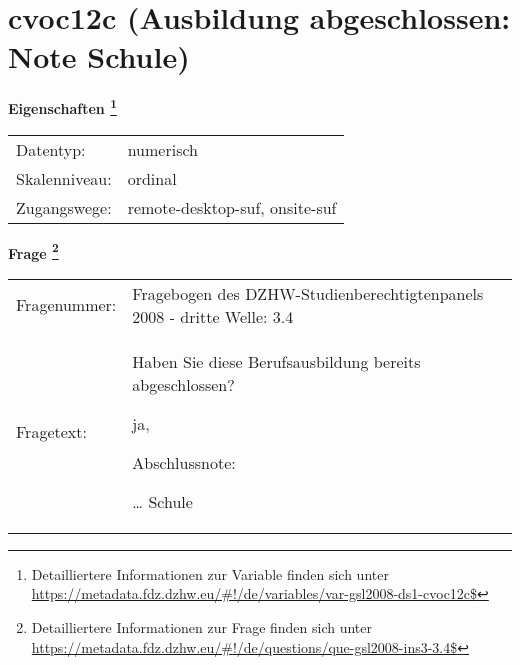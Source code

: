 
    \setcounter{footnote}{0}

    \vspace*{-1.8cm}
	\section{cvoc12c (Ausbildung abgeschlossen: Note Schule)}
	\label{section:cvoc12c}



    \vspace*{0.5cm}
    \noindent\textbf{Eigenschaften
	\footnote{Detailliertere Informationen zur Variable finden sich unter
		\url{https://metadata.fdz.dzhw.eu/\#!/de/variables/var-gsl2008-ds1-cvoc12c$}}}\\
	\begin{tabularx}{\hsize}{@{}lX}
	Datentyp: & numerisch \\
	Skalenniveau: & ordinal \\
	Zugangswege: &
	  remote-desktop-suf, 
	  onsite-suf
 \\
    \end{tabularx}



				\vspace*{0.5cm}
                \noindent\textbf{Frage
	                \footnote{Detailliertere Informationen zur Frage finden sich unter
		              \url{https://metadata.fdz.dzhw.eu/\#!/de/questions/que-gsl2008-ins3-3.4$}}}\\
				\begin{tabularx}{\hsize}{@{}lX}
					Fragenummer: &
					  Fragebogen des DZHW-Studienberechtigtenpanels 2008 - dritte Welle:
					  3.4
 \\
					Fragetext: & Haben Sie diese Berufsausbildung bereits abgeschlossen?\par  ja, \par  Abschlussnote:\par  … Schule \\
				\end{tabularx}





